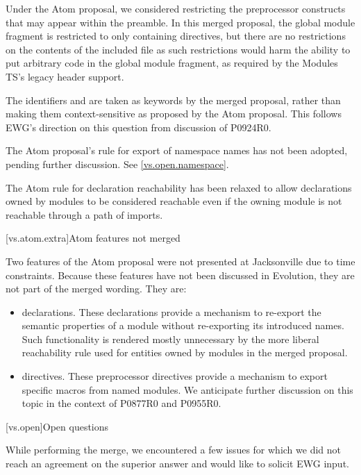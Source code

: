 \pnum
Under the Atom proposal,
we considered restricting the preprocessor constructs that may appear
within the preamble.
In this merged proposal,
the global module fragment is restricted
to only containing  directives,
but there are no restrictions on the contents
of the included file
as such restrictions would harm the ability
to put arbitrary code in the global module fragment,
as required by the Modules TS's legacy header support.

\pnum
The identifiers  and  are taken as keywords
by the merged proposal,
rather than making them context-sensitive as proposed by the Atom proposal.
This follows EWG's direction on this question from discussion of P0924R0.

\pnum
The Atom proposal's rule for export of namespace names has not been adopted,
pending further discussion. See \ref{vs.open.namespace}.

\pnum
The Atom rule for declaration reachability
has been relaxed to allow declarations owned by modules
to be considered reachable even if the owning module
is not reachable through a path of imports.

[vs.atom.extra]{Atom features not merged}

\pnum
Two features of the Atom proposal were not presented at Jacksonville
due to time constraints.
Because these features have not been discussed in Evolution,
they are not part of the merged wording. They are:

\begin{itemize}
\item
{} declarations.
These declarations provide a mechanism to re-export
the semantic properties of a module
without re-exporting its introduced names.
Such functionality is rendered mostly unnecessary
by the more liberal reachability rule
used for entities owned by modules
in the merged proposal.

\item
{} directives.
These preprocessor directives provide a mechanism
to export specific macros from named modules.
We anticipate further discussion on this topic
in the context of P0877R0 and P0955R0.
\end{itemize}

[vs.open]{Open questions}

\pnum
While performing the merge, we encountered a few issues
for which we did not reach an agreement on the superior answer
and would like to solicit EWG input.

